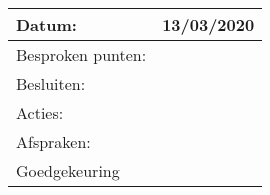 \begin{tabularx}{\textwidth}{| l | X |}
  \hline
  Datum: & 13/03/2020\\
  \hline
  Besproken punten: & \\
  \hline
  Besluiten: & \\
  Acties: & \\
  Afspraken: & \\
  \hline
  Goedgekeuring & \\
  \hline
\end{tabularx}